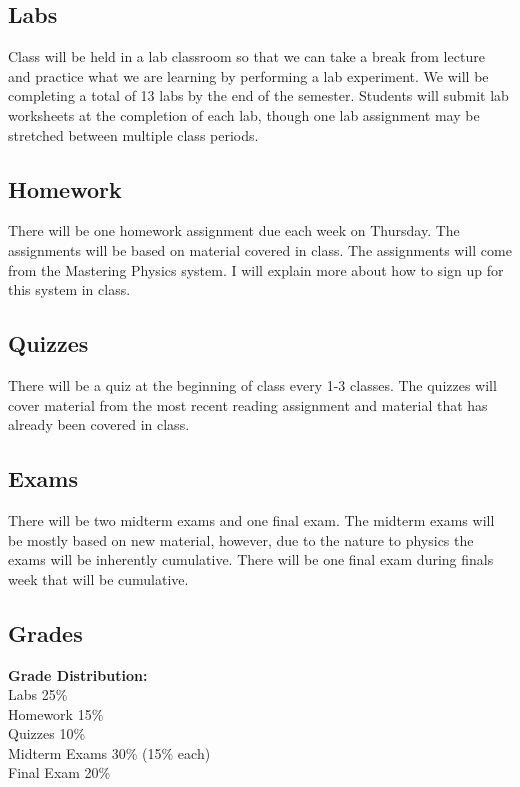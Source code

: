 \documentclass[12pt]{article}
\newcommand{\tabg}{4.3cm} %
\begin{document}
\subsection*{Labs}
Class will be held in a lab classroom so that we can take a break from lecture and practice what we are learning by performing a lab experiment. We will be completing a total of 13 labs by the end of the semester. Students will submit lab worksheets at the completion of each lab, though one lab assignment may be stretched between multiple class periods.

\subsection*{Homework}
There will be one homework assignment due each week on Thursday. The assignments will be based on material covered in class. The assignments will come from the Mastering Physics system. I will explain more about how to sign up for this system in class.

\subsection*{Quizzes}
There will be a quiz at the beginning of class every 1-3 classes. The quizzes will cover material from the most recent reading assignment and material that has already been covered in class.

\subsection*{Exams}
There will be two midterm exams and one final exam. The midterm exams will be mostly based on new material, however, due to the nature to physics the exams will be inherently cumulative. There will be one final exam during finals week that will be cumulative.

\subsection*{Grades}
\textbf{Grade Distribution:} \\
Labs \tabto{\tabg} 25\% \\
Homework \tabto{\tabg} 15\% \\
Quizzes \tabto{\tabg} 10\% \\
Midterm Exams \tabto{\tabg} 30\% (15\% each) \\
Final Exam \tabto{\tabg} 20\% \\
\end{document}
